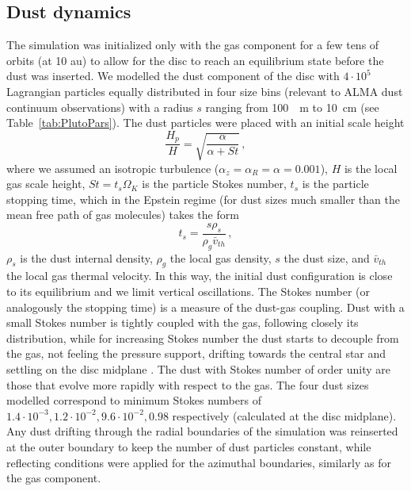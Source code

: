 \documentclass[fleqn,usenatbib]{mnras}
\begin{document}
    \subsection{Dust dynamics}\label{sec:dust}
    
        The simulation was initialized only with the gas component for a few tens of orbits (at 10 au) to allow for the disc to reach an equilibrium state before the dust was inserted.
        We modelled the dust component of the disc with $4\cdot10^5$ Lagrangian particles equally distributed in four size bins (relevant to ALMA dust continuum observations) with a radius $s$ ranging from \SI{100}{\mu m} to \SI{10}{cm} (see Table~\ref{tab:PlutoPars}).
        The dust particles were placed with an initial scale height \citep{Youdin2007}
        \begin{equation}\label{eq:scale-height}
            \frac{H_p}{H} = \sqrt{\frac{\alpha}{\alpha + St}}\,,
        \end{equation}
        where we assumed an isotropic turbulence ($\alpha_z = \alpha_R = \alpha = 0.001$), $H$ is the local gas scale height, $St = t_s\Omega_K$ is the particle Stokes number, $t_s$ is the particle stopping time, which in the Epstein regime (for dust sizes much smaller than the mean free path of gas molecules) takes the form
        \begin{equation}\label{eq:Stokes_number}
            t_s = \frac{s\rho_s}{\rho_g\bar{v}_{th}}\,,
        \end{equation}
        $\rho_s$ is the dust internal density, $\rho_g$ the local gas density, $s$ the dust size, and $\bar{v}_{th}$ the local gas thermal velocity. In this way, the initial dust configuration is close to its equilibrium and we limit vertical oscillations.
        The Stokes number (or analogously the stopping time) is a measure of the dust-gas coupling. Dust with a small Stokes number is tightly coupled with the gas, following closely its distribution, while for increasing Stokes number the dust starts to decouple from the gas, not feeling the pressure support, drifting towards the central star and settling on the disc midplane \citep{Whipple1972,Weidenschilling1977}. The dust with Stokes number of order unity are those that evolve more rapidly with respect to the gas.
        The four dust sizes modelled correspond to minimum Stokes numbers of $1.4\cdot10^{-3}, 1.2\cdot10^{-2}, 9.6\cdot10^{-2}, 0.98$ respectively (calculated at the disc midplane).
        Any dust drifting through the radial boundaries of the simulation was reinserted at the outer boundary to keep the number of dust particles constant, while reflecting conditions were applied for the azimuthal boundaries, similarly as for the gas component.
\end{document}
